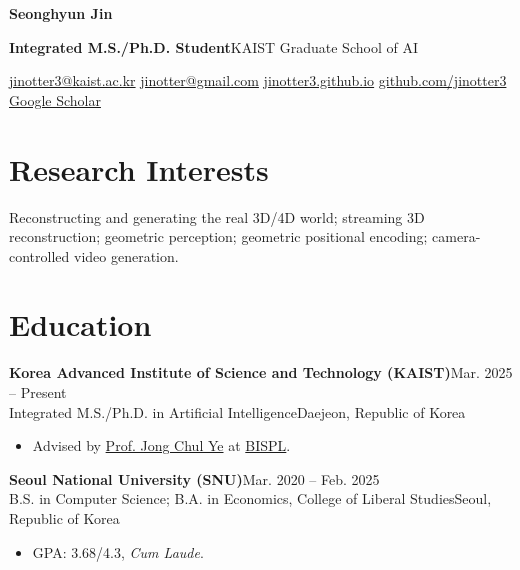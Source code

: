 \documentclass[10pt,letterpaper]{article}
\newcommand{\sep}{\hspace{0.45em}{\color{rule}\textbar}\hspace{0.45em}}
\newcommand{\entry}[4]{%
  \noindent\textbf{#1}\hfill{\small\color{gray}#2}\\
  \noindent #3\hfill{\small\color{gray}#4}\par}
\begin{document}
\fontsize{10pt}{13pt}\selectfont

{\fontsize{22}{24}\selectfont\bfseries\color{navy} Seonghyun Jin}\par
\vspace{0.25em}
\textbf{Integrated M.S./Ph.D. Student}\sep KAIST Graduate School of AI\par
\vspace{0.15em}
{\small
\href{mailto:jinotter3@kaist.ac.kr}{jinotter3@kaist.ac.kr}\sep
\href{mailto:jinotter@gmail.com}{jinotter@gmail.com}\sep
\href{https://jinotter3.github.io/}{jinotter3.github.io}\sep
\href{https://github.com/jinotter3}{github.com/jinotter3}\sep
\href{https://scholar.google.com/citations?user=L13GpZIAAAAJ&hl=ko}{Google Scholar}}\par

\section{Research Interests}
Reconstructing and generating the real 3D/4D world; streaming 3D reconstruction; geometric perception; geometric positional encoding; camera-controlled video generation.\par

\section{Education}
\entry{Korea Advanced Institute of Science and Technology (KAIST)}{Mar. 2025 -- Present}
      {Integrated M.S./Ph.D. in Artificial Intelligence}{Daejeon, Republic of Korea}
\begin{itemize}
  \item Advised by \href{https://scholar.google.com/citations?user=HNMjoNEAAAAJ&hl=en}{Prof. Jong Chul Ye} at \href{https://bispl-website.github.io/}{BISPL}.
\end{itemize}
\vspace{0.6em}
\entry{Seoul National University (SNU)}{Mar. 2020 -- Feb. 2025}
      {B.S. in Computer Science; B.A. in Economics, College of Liberal Studies}{Seoul, Republic of Korea}
\begin{itemize}
  \item GPA: 3.68/4.3, \emph{Cum Laude}.
\end{itemize}

\end{document}
